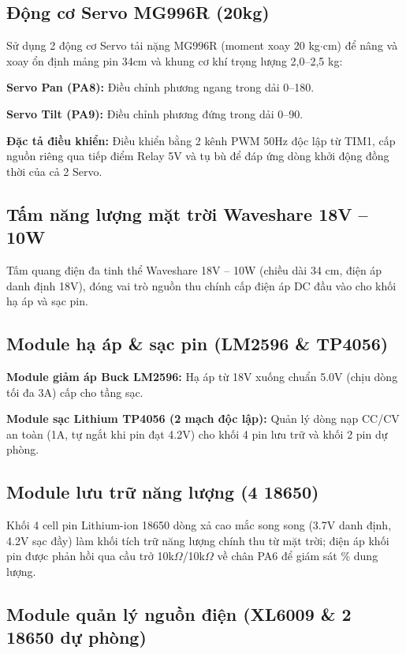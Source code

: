\documentclass[12pt,a4paper]{report}
\begin{document}
\subsection{Động cơ Servo MG996R (20kg)}

Sử dụng 2 động cơ Servo tải nặng MG996R (moment xoay 20 kg\ensuremath{\cdot}cm) để nâng và xoay ổn định mảng pin 34cm và khung cơ khí trọng lượng 2,0--2,5 kg:

\textbf{Servo Pan (PA8): }Điều chỉnh phương ngang trong dải 0\textdegree{}--180\textdegree{}.

\textbf{Servo Tilt (PA9): }Điều chỉnh phương đứng trong dải 0\textdegree{}--90\textdegree{}.

\textbf{Đặc tả điều khiển: }Điều khiển bằng 2 kênh PWM 50Hz độc lập từ TIM1, cấp nguồn riêng qua tiếp điểm Relay 5V và tụ bù để đáp ứng dòng khởi động đồng thời của cả 2 Servo.

\subsection{Tấm năng lượng mặt trời Waveshare 18V -- 10W}

Tấm quang điện đa tinh thể Waveshare 18V -- 10W (chiều dài 34 cm, điện áp danh định 18V), đóng vai trò nguồn thu chính cấp điện áp DC đầu vào cho khối hạ áp và sạc pin.

\subsection{Module hạ áp \& sạc pin (LM2596 \& TP4056)}

\textbf{Module giảm áp Buck LM2596: }Hạ áp từ 18V xuống chuẩn 5.0V (chịu dòng tối đa 3A) cấp cho tầng sạc.

\textbf{Module sạc Lithium TP4056 (2 mạch độc lập): }Quản lý dòng nạp CC/CV an toàn (1A, tự ngắt khi pin đạt 4.2V) cho khối 4 pin lưu trữ và khối 2 pin dự phòng.

\subsection{Module lưu trữ năng lượng (4 \texttimes{} 18650)}

Khối 4 cell pin Lithium-ion 18650 dòng xả cao mắc song song (3.7V danh định, 4.2V sạc đầy) làm khối tích trữ năng lượng chính thu từ mặt trời; điện áp khối pin được phản hồi qua cầu trở 10k\ensuremath{\Omega}/10k\ensuremath{\Omega} về chân PA6 để giám sát \% dung lượng.

\subsection{Module quản lý nguồn điện (XL6009 \& 2 \texttimes{} 18650 dự phòng)}
\end{document}

